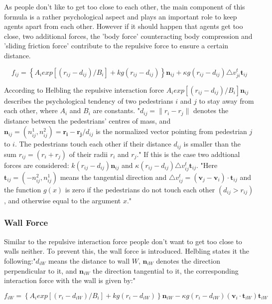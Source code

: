 \documentclass[11pt]{article}
\begin{document}
As people don't like to get too close to each other, the main component of this
formula is a rather psychological aspect and plays an important role to keep
agents apart from each other. However if it should happen that agents get too
close, two additional forces, the 'body force' counteracting body compression
and 'sliding friction force' contribute to the repulsive force to ensure a
certain distance. \cite{SDFEP} 

\begin{equation}
f_{ij}=\left\{A_{i}exp[(r_{ij}-d_{ij})/B_{i}]+kg(r_{ij}-d_{ij})\right\}\mathbf{n}_{ij}+\kappa g(r_{ij}-d_{ij})\triangle v_{ji}^t\mathbf{t}_{ij}
\end{equation}

According to Helbling the repulsive interaction force $A_{i}exp[(r_{ij}-d_{ij})/B_{i}]\mathbf{n}_{ij}$ describes the psychological tendency of two pedestrians $i$ and $j$ to stay away from each other, where $A_i$ and $B_i$ are constants. 
"$d_{ij}=\|r_i-r_j\|$ denotes the distance between the pedestrians' centres of mass, and $\mathbf{n}_{ij}=(n_{ij}^1, n_{ij}^2)=\mathbf{r_i}-\mathbf{r_j}/d_{ij}$ is the normalized vector pointing from pedestrian $j$ to $i$.
The pedestrians touch each other if their distance $d_{ij}$ is smaller than the sum $r_{ij}=(r_i+r_j)$ of their radii $r_i$ and $r_j$."\cite{SDFEP}
If this is the case two addtional forces are considered:
$k(r_{ij}-d_{ij})\mathbf{n}_{ij}$ and $\kappa(r_{ij}-d_{ij})\triangle
v_{ij}^t\mathbf{t}_{ij}$. "Here $\mathbf{t}_{ij}=(-n_{ij}^2,n_{ij}^1)$ means
the tangential direction and $\triangle
v_{ij}^t=(\mathbf{v}_j-\mathbf{v}_i)\cdot\mathbf{t}_{ij}$ and the function
$g(x)$ is zero if the pedestrians do not touch each other $(d_{ij}>r_{ij})$,
and otherwise equal to the argument $x$."\cite{SDFEP}

\subsubsection{Wall Force}
Similar to the repulsive interaction force people don't want to get too close to walls neither. To prevent this, the wall force is introduced.
Helbling states it the following:"$d_{iW}$ means the distance to wall $W$, $\mathbf{n}_{iW}$ denotes  the direction perpendicular to it, and $\mathbf{n}_{iW}$ the direction tangential to it, the corresponding interaction force with the wall is given by:" \cite{SFMPD}

\begin{equation}
f_{iW}=\left\{A_{i}exp[(r_{i}-d_{iW})/B_{i}]+kg(r_{i}-d_{iW})\right\}\mathbf{n}_{iW}-\kappa g(r_{i}-d_{iW})(\mathbf{v}_{i}\cdot\mathbf{t}_{iW})\mathbf{t}_{iW}
\end{equation}
\end{document}
